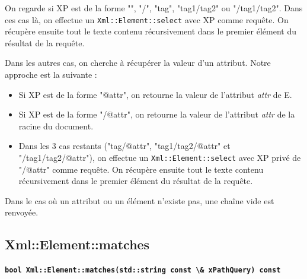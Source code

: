     On regarde si XP est de la forme "", "/", "tag", "tag1/tag2" ou "/tag1/tag2".
    Dans ces cas là, on effectue un \lstinline$Xml::Element::select$ avec XP comme requête.
    On récupère ensuite tout le texte contenu récursivement dans le premier élément du résultat de la requête.

    Dans les autres cas, on cherche à récupérer la valeur d'un attribut. Notre approche est la suivante :
    \begin{itemize}
        \item Si XP est de la forme "@attr", on retourne la valeur de l'attribut \textit{attr} de E.
        \item Si XP est de la forme "/@attr", on retourne la valeur de l'attribut \textit{attr} de la racine du document.
        \item Dans les 3 cas restants ("tag/@attr", "tag1/tag2/@attr" et "/tag1/tag2/@attr"), on effectue un \lstinline$Xml::Element::select$ avec XP privé de "/@attr" comme requête.
        On récupère ensuite tout le texte contenu récursivement dans le premier élément du résultat de la requête.
        \\
    \end{itemize}

    Dans le cas où un attribut ou un élément n'existe pas, une chaîne vide est renvoyée.


    \subsection{Xml::Element::matches}

    \textbf{\lstinline$bool Xml::Element::matches(std::string const \& xPathQuery) const$}

